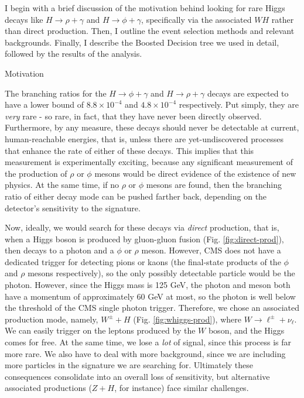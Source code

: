 %
%

I begin with a brief discussion of the motivation behind looking for rare Higgs decays like $H \rightarrow \rho+\gamma$ and $H \rightarrow \phi+\gamma$, specifically via the associated $WH$ rather than direct production. Then, I outline the event selection methods and relevant backgrounds. Finally, I describe the Boosted Decision tree we used in detail, followed by the results of the analysis.

\begin{section}{Motivation}\label{motivation}

The branching ratios for the $H \rightarrow \phi+\gamma$ and $H \rightarrow \rho+\gamma$ decays are expected to have a lower bound of $8.8 \times 10^{-4}$ and $4.8 \times 10^{-4}$  respectively\cite{cite-rpg-brs}. Put simply, they are \textit{very} rare - so rare, in fact, that they have never been directly observed. Furthermore, by any measure, these decays should never be detectable at current, human-reachable energies, that is, unless there are yet-undiscovered processes that enhance the rate of either of these decays. This implies that this measurement is experimentally exciting, because any significant measurement of the production of $\rho$ or $\phi$ mesons would be direct evidence of the existence of new physics. At the same time, if no $\rho$ or $\phi$ mesons are found, then the branching ratio of either decay mode can be pushed farther back, depending on the detector's sensitivity to the signature.

Now, ideally, we would search for these decays via \textit{direct} production, that is, when a Higgs boson is produced by gluon-gluon fusion (Fig. \ref{fig:direct-prod}), then decays to a photon and a $\phi$ or $\rho$ meson. However, CMS does not have a dedicated trigger for detecting pions or kaons (the final-state products of the $\phi$ and $\rho$ mesons respectively), so the only possibly detectable particle would be the photon. However, since the Higgs mass is 125 GeV, the photon and meson both have a momentum of approximately 60 GeV at most, so the photon is well below the threshold of the CMS single photon trigger\cite{cite-hlt}. Therefore, we chose an associated production mode, namely, $W^{\pm}+H$ (Fig. \ref{fig:whiggs-prod}), where $W \rightarrow \ell^{\pm}+\nu_{\ell}$. We can easily trigger on the leptons produced by the $W$ boson, and the Higgs comes for free. At the same time, we lose a \textit{lot} of signal, since this process is far more rare. We also have to deal with more background, since we are including more particles in the signature we are searching for. Ultimately these consequences consolidate into an overall loss of sensitivity, but alternative associated productions ($Z+H$, for instance) face similar challenges.


\end{section}

